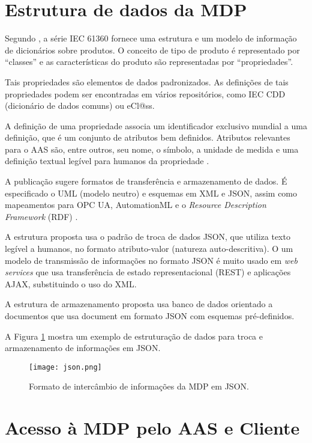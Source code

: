 	
	
	
	
\section{Estrutura de dados da MDP}

	Segundo , a série IEC 61360 fornece uma estrutura e um modelo de informação de dicionários sobre produtos. O conceito de tipo de produto é representado por ``classes'' e as características do produto são representadas por ``propriedades''.

	Tais propriedades são elementos de dados padronizados. As definições de tais propriedades podem ser encontradas em vários repositórios, como IEC CDD (dicionário de dados comuns) ou eCl@ss.
	
	A definição de uma propriedade associa um identificador exclusivo mundial a uma definição, que é um conjunto de atributos bem definidos. Atributos relevantes para o AAS são, entre outros, seu nome, o símbolo, a unidade de medida e uma definição textual legível para humanos da propriedade \cite{bader2019aas}.
	
	A publicação sugere formatos de transferência e armazenamento de dados. É especificado o UML (modelo neutro) e esquemas em XML e JSON, assim como mapeamentos para OPC UA, AutomationML e o \textit{Resource Description Framework} (RDF) \cite{plattform2019detailsaas}.
	
	A estrutura proposta usa o padrão de troca de dados JSON, que utiliza texto legível a humanos, no formato atributo-valor (natureza auto-descritiva). O um modelo de transmissão de informações no formato JSON é muito usado em \textit{web services} que usa transferência de estado representacional (REST) e aplicações AJAX, substituindo o uso do XML.
	
	A estrutura de armazenamento proposta usa banco de dados orientado a documentos que usa document em formato JSON com esquemas pré-definidos.
	
	A Figura \ref{fig:json} mostra um exemplo de estruturação de dados para troca e armazenamento de informações em JSON.
	
	\begin{figure}[H]
		\centering
		\caption{Formato de intercâmbio de informações da MDP em JSON.}
		\texttt{[image: json.png]}
		\label{fig:json}
  \end{figure}
  

  \section{Acesso à MDP pelo AAS e Cliente}
	\label{comunicacao-CS}
	
